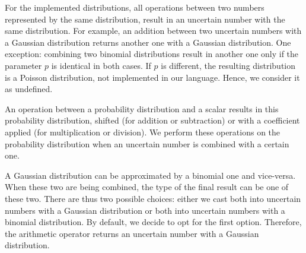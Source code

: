 For the implemented distributions, all operations between two numbers represented by the same distribution, result in an uncertain number with the same distribution. 
For example, an addition between two uncertain numbers with a Gaussian distribution returns another one with a Gaussian distribution.
One exception: combining two binomial distributions result in another one only if the parameter $p$ is identical in both cases.
If $p$ is different, the resulting distribution is a Poisson distribution, not implemented in our language.
Hence, we consider it as undefined.

An operation between a probability distribution and a scalar results in this probability distribution, shifted (for addition or subtraction) or with a coefficient applied (for multiplication or division).
We perform these operations on the probability distribution when an uncertain number is combined with a certain one.

A Gaussian distribution can be approximated by a binomial one and vice-versa.
When these two are being combined, the type of the final result can be one of these two.
There are thus two possible choices: either we cast both into uncertain numbers with a Gaussian distribution or both into uncertain numbers with a binomial distribution.
By default, we decide to opt for the first option.
Therefore, the arithmetic operator returns an uncertain number with a Gaussian distribution.







